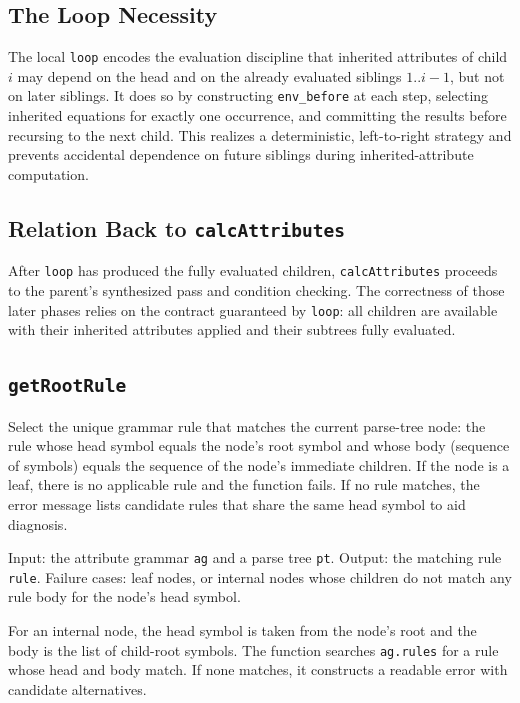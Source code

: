 \subsection{The Loop Necessity}
The local \texttt{loop} encodes the evaluation discipline that inherited attributes of child \(i\) may depend on the head and on the already evaluated 
siblings \(1..i-1\), but not on later siblings. It does so by constructing \texttt{env\_before} at each step, selecting inherited equations for exactly 
one occurrence, and committing the results before recursing to the next child. This realizes a deterministic, left-to-right strategy and prevents 
accidental dependence on future siblings during inherited-attribute computation. 

\subsection{Relation Back to \texttt{calcAttributes}}
After \texttt{loop} has produced the fully evaluated children, \texttt{calcAttributes} proceeds to the parent's synthesized pass and condition checking. 
The correctness of those later phases relies on the contract guaranteed by \texttt{loop}: all children are available with their inherited attributes applied 
and their subtrees fully evaluated.


\subsection{\texttt{getRootRule}}
Select the unique grammar rule that matches the current parse-tree node: the rule whose head symbol equals the node's root symbol and whose body 
(sequence of symbols) equals the sequence of the node's immediate children. If the node is a leaf, there is no applicable rule and the function fails. 
If no rule matches, the error message lists candidate rules that share the same head symbol to aid diagnosis. 

Input: the attribute grammar \texttt{ag} and a parse tree \texttt{pt}.  
Output: the matching rule \texttt{rule}.  
Failure cases: leaf nodes, or internal nodes whose children do not match any rule body for the node's head symbol. 

For an internal node, the head symbol is taken from the node's root and the body is the list of child-root symbols. The function searches \texttt{ag.rules} for 
a rule whose head and body match. If none matches, it constructs a readable error with candidate alternatives. 

